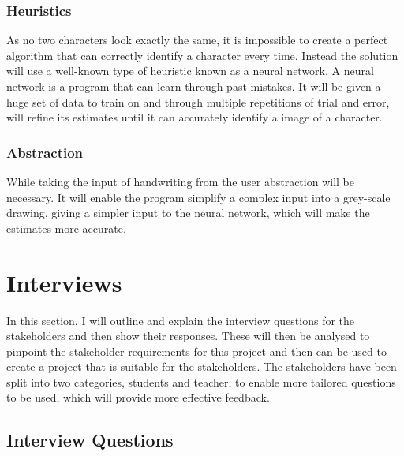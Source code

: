 \documentclass{report}
\begin{document}
\subsubsection{Heuristics}
As no two characters look exactly the same, it is impossible to create a perfect algorithm that can correctly identify a character every time. Instead the solution will use a well-known type of heuristic known as a neural network. A neural network is a program that can learn through past mistakes. It will be given a huge set of data to train on and through multiple repetitions of trial and error, will refine its estimates until it can accurately identify a image of a character.

\subsubsection{Abstraction}
While taking the input of handwriting from the user abstraction will be necessary. It will enable the program simplify a complex input into a grey-scale drawing, giving a simpler input to the neural network, which will make the estimates more accurate.
\newpage

\section{Interviews}
In this section, I will outline and explain the interview questions for the stakeholders and then show their responses. These will then be analysed to pinpoint the stakeholder requirements for this project and then can be used to create a project that is suitable for the stakeholders.
\newline
The stakeholders have been split into two categories, students and teacher, to enable more tailored questions to be used, which will provide more effective feedback.
\subsection{Interview Questions}
\end{document}
